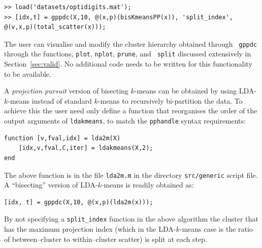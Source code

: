 \documentclass{book}
\begin{document}
\begin{lstlisting}
>> load('datasets/optidigits.mat');
>> [idx,t] = gppdc(X,10, @(x,p)(bisKmeansPP(x)), 'split_index', @(v,x,p)(total_scatter(x)));
\end{lstlisting}


\noindent
%
The user can visualise and modify the cluster hierarchy obtained through {\tt
gppdc} through the functions, {\tt plot}, {\tt nplot}, {\tt prune}, and {\tt
split} discussed extensively in Section~\ref{sec:valid}. No additional code
needs to be written for this functionality to be available.



A {\em projection pursuit} version of bisecting $k$-means
can be obtained by using LDA-$k$-means instead of standard $k$-means to recursively bi-partition
the data.
To achieve this the user need only define a function that reorganises the order of the output
arguments of {\tt ldakmeans}, to match the {\tt pphandle} syntax requirements:


\begin{lstlisting}
function [v,fval,idx] = lda2m(X)
	[idx,v,fval,C,iter] = ldakmeans(X,2);
end
\end{lstlisting}


\noindent
%
The above function is in the file {\tt lda2m.m} in the directory {\tt src/generic} script file.
A ``bisecting'' version of LDA-$k$-means is readily obtained as:


\begin{lstlisting}
[idx, t] = gppdc(X,10, @(x,p)(lda2m(x)));
\end{lstlisting}



\noindent
%
By not specifying a {\tt split\_index} function in the above algorithm the
cluster that has the maximum projection index (which in the LDA-$k$-means case
is the ratio of between--cluster to within--cluster scatter) is split at each step.



\end{document}
